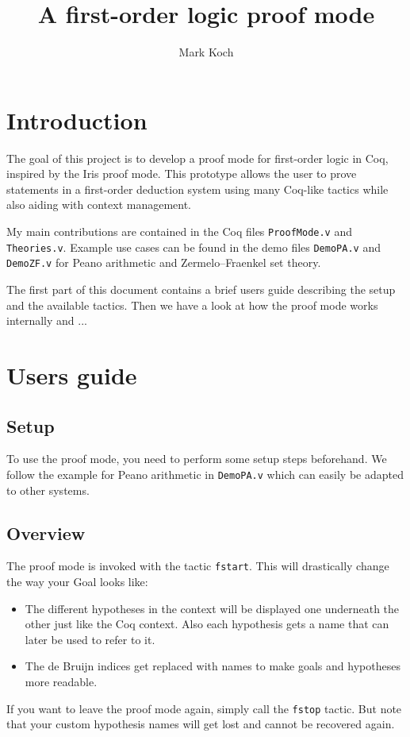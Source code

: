 \documentclass[12pt, a4paper]{article}
\title{A first-order logic proof mode}
\author{Mark Koch}
\begin{document}
\maketitle
\tableofcontents


\section{Introduction}

The goal of this project is to develop a proof mode for first-order logic in Coq, inspired by the Iris proof mode.
This prototype allows the user to prove statements in a first-order deduction system using many Coq-like tactics while also aiding with context management.

My main contributions are contained in the Coq files \texttt{ProofMode.v} and \texttt{Theories.v}. Example use cases can be found in the demo files \texttt{DemoPA.v} and \texttt{DemoZF.v} for Peano arithmetic and Zermelo–Fraenkel set theory.

The first part of this document contains a brief users guide describing the setup and the available tactics.
Then we have a look at how the proof mode works internally and ...


\section{Users guide}

\subsection{Setup}

To use the proof mode, you need to perform some setup steps beforehand.
We follow the example for Peano arithmetic in \texttt{DemoPA.v} which can easily be adapted to other systems.


\subsection{Overview}

The proof mode is invoked with the tactic \texttt{fstart}. This will drastically change the way your Goal looks like:
\begin{itemize}
	\item 
	The different hypotheses in the context will be displayed one underneath the other just like the Coq context.
	Also each hypothesis gets a name that can later be used to refer to it.
	
	\item 
	The de Bruijn indices get replaced with names to make goals and hypotheses more readable.
\end{itemize}
If you want to leave the proof mode again, simply call the \texttt{fstop} tactic.
But note that your custom hypothesis names will get lost and cannot be recovered again.
\end{document}

